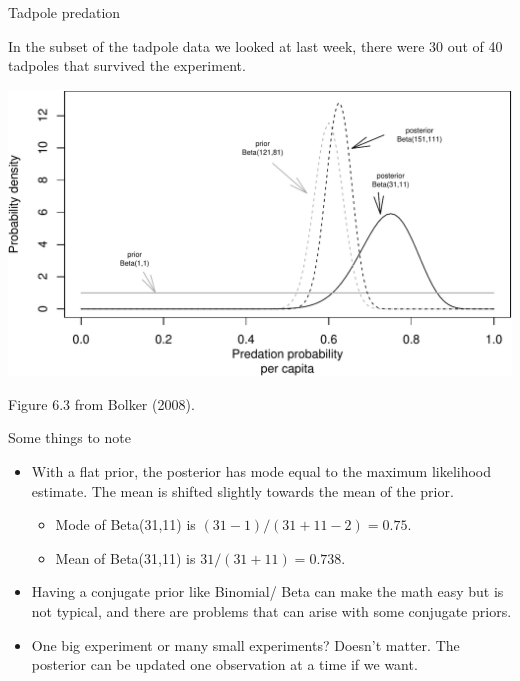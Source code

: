 \documentclass[
  ignorenonframetext,
]{beamer}
\providecommand{\tightlist}{%
  \setlength{\itemsep}{0pt}\setlength{\parskip}{0pt}}
\begin{document}
\begin{frame}{Tadpole predation}
\protect\hypertarget{tadpole-predation}{}

In the subset of the tadpole data we looked at last week, there were 30
out of 40 tadpoles that survived the experiment.

\includegraphics{intro_Bayes_files/figure-beamer/unnamed-chunk-2-1.pdf}

Figure 6.3 from Bolker (2008).

\end{frame}

\begin{frame}{Some things to note}
\protect\hypertarget{some-things-to-note}{}

\begin{itemize}
\item
  With a flat prior, the posterior has mode equal to the maximum
  likelihood estimate. The mean is shifted slightly towards the mean of
  the prior.

  \begin{itemize}
  \tightlist
  \item
    Mode of Beta(31,11) is \((31-1)/(31+11-2)=0.75\).
  \item
    Mean of Beta(31,11) is \(31/(31+11)=0.738\).
  \end{itemize}
\item
  Having a conjugate prior like Binomial/ Beta can make the math easy
  but is not typical, and there are problems that can arise with some
  conjugate priors.
\item
  One big experiment or many small experiments? Doesn't matter. The
  posterior can be updated one observation at a time if we want.
\end{itemize}

\end{frame}
\end{document}
